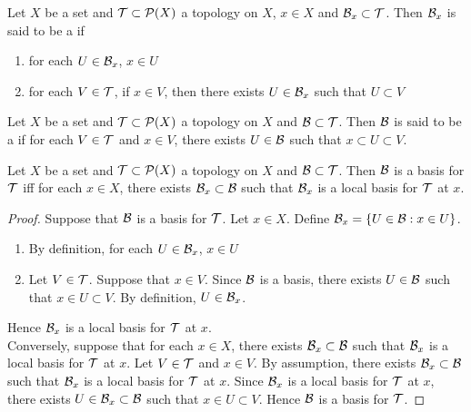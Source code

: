 \documentclass{book}
\begin{document}
	
	\begin{defn} 
	Let $X$ be a set and $\mathcal{T} \subset \mathcal{P}(X)$ a topology on $X$, $x \in X$ and $\mathcal{B}_x \subset \mathcal{T}$. Then $\mathcal{B}_x$ is said to be a  if 
	\begin{enumerate}
	\item for each $U \in \mathcal{B}_x$, $x \in U$
	\item for each $V \in \mathcal{T}$, if $x \in V$, then there exists $U \in \mathcal{B}_x$ such that $U \subset V$
	\end{enumerate}
	\end{defn}
	
	\begin{defn} 
	Let $X$ be a set and $\mathcal{T} \subset \mathcal{P}(X)$ a topology on $X$ and $\mathcal{B} \subset \mathcal{T}$. Then $\mathcal{B}$ is said to be a  if for each $V \in \mathcal{T}$ and $x \in V$, there exists $U \in \mathcal{B}$ such that $x \subset U \subset V$.
	\end{defn}

	\begin{ex} 
	Let $X$ be a set and $\mathcal{T} \subset \mathcal{P}(X)$ a topology on $X$ and $\mathcal{B} \subset \mathcal{T}$. Then $\mathcal{B}$ is a basis for $\mathcal{T}$ iff for each $x \in X$, there exists $\mathcal{B}_x \subset \mathcal{B}$ such that $\mathcal{B}_x$ is a local basis for $\mathcal{T}$ at $x$. 
	\end{ex}

	\begin{proof}
		Suppose that $\mathcal{B}$ is a basis for $\mathcal{T}$. Let $x \in X$. Define $\mathcal{B}_x = \{U \in \mathcal{B}: x \in U\}$. 
		\begin{enumerate}
			\item By definition, for each $U \in \mathcal{B}_x$, $x \in U$
			\item Let $V \in \mathcal{T}$. Suppose that $x \in V$. Since $\mathcal{B}$ is a basis, there exists $U \in \mathcal{B}$ such that $x \in U \subset V$. By definition, $U \in \mathcal{B}_x$.
		\end{enumerate}
		Hence $\mathcal{B}_x$ is a local basis for $\mathcal{T}$ at $x$. \\
		Conversely, suppose that for each $x \in X$, there exists $\mathcal{B}_x \subset \mathcal{B}$ such that $\mathcal{B}_x$ is a local basis for $\mathcal{T}$ at $x$. Let $V \in \mathcal{T}$ and $x \in V$. By assumption, there exists $\mathcal{B}_x \subset \mathcal{B}$ such that $\mathcal{B}_x$ is a local basis for $\mathcal{T}$ at $x$. Since $\mathcal{B}_x$ is a local basis for $\mathcal{T}$ at $x$, there exists $U \in \mathcal{B}_x \subset \mathcal{B}$ such that $x \in U \subset V$. Hence $\mathcal{B}$ is a basis for $\mathcal{T}$. 
	\end{proof}
	
\end{document}
